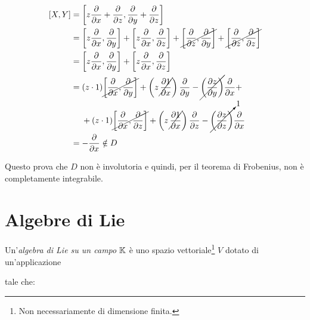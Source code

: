 \begin{align}
	\begin{split}
		[X,Y] &= \left[ z \dfrac{\partial}{\partial x} + \dfrac{\partial}{\partial z} , \dfrac{\partial}{\partial y} + \dfrac{\partial}{\partial z} \right]\\
		&= \left[ z \dfrac{\partial}{\partial x}, \dfrac{\partial}{\partial y} \right] + \left[ z \dfrac{\partial}{\partial x}, \dfrac{\partial}{\partial z} \right] + \cancel{\left[ \dfrac{\partial}{\partial z}, \dfrac{\partial}{\partial y} \right]} + \cancel{\left[ \dfrac{\partial}{\partial z}, \dfrac{\partial}{\partial z} \right]}\\
		&= \left[ z \dfrac{\partial}{\partial x}, \dfrac{\partial}{\partial y} \right] + \left[ z \dfrac{\partial}{\partial x}, \dfrac{\partial}{\partial z} \right]\\
		&= (z \cdot 1) \cancel{\left[ \dfrac{\partial}{\partial x}, \dfrac{\partial}{\partial y} \right]} + \left( z \, \cancel{\dfrac{\partial 1}{\partial x}} \right) \dfrac{\partial}{\partial y} - \cancel{\left( \dfrac{\partial z}{\partial y} \right)} \dfrac{\partial}{\partial x} + \\
		& \hspace{13px} + (z \cdot 1) \cancel{\left[ \dfrac{\partial}{\partial x}, \dfrac{\partial}{\partial z} \right]} + \left( z \, \cancel{\dfrac{\partial 1}{\partial x}} \right) \dfrac{\partial}{\partial z} - \cancelto{1}{\left( \dfrac{\partial z}{\partial z} \right)} \dfrac{\partial}{\partial x}\\
		&= - \dfrac{\partial}{\partial x} \notin D
	\end{split}
\end{align}

Questo prova che $ D $ non è involutoria e quindi, per il teorema di Frobenius, non è completamente integrabile.

\section{Algebre di Lie}

Un'\textit{algebra di Lie su un campo} $ \mathbb{K} $ è uno spazio vettoriale\footnote{%
	Non necessariamente di dimensione finita.%
} $ V $ dotato di un'applicazione


tale che:

